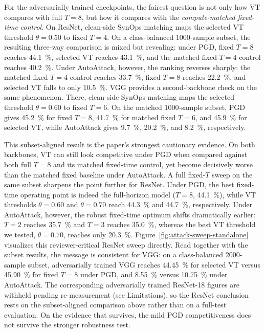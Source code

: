 \documentclass[11pt]{article}
\begin{document}
For the adversarially trained checkpoints, the fairest question is not only how VT compares with full $T=8$, but how it compares with the \emph{compute-matched fixed-time control}. On ResNet, clean-side SynOps matching maps the selected VT threshold $\theta=0.50$ to fixed $T=4$. On a class-balanced \num{1000}-sample subset, the resulting three-way comparison is mixed but revealing: under PGD, fixed $T=8$ reaches \SI{44.1}{\percent}, selected VT reaches \SI{43.1}{\percent}, and the matched fixed-$T=4$ control reaches \SI{40.2}{\percent}. Under AutoAttack, however, the ranking reverses sharply: the matched fixed-$T=4$ control reaches \SI{33.7}{\percent}, fixed $T=8$ reaches \SI{22.2}{\percent}, and selected VT falls to only \SI{10.5}{\percent}. VGG provides a second-backbone check on the same phenomenon. There, clean-side SynOps matching maps the selected threshold $\theta=0.60$ to fixed $T=6$. On the matched \num{1000}-sample subset, PGD gives \SI{45.2}{\percent} for fixed $T=8$, \SI{41.7}{\percent} for matched fixed $T=6$, and \SI{45.9}{\percent} for selected VT, while AutoAttack gives \SI{9.7}{\percent}, \SI{20.2}{\percent}, and \SI{8.2}{\percent}, respectively.

This subset-aligned result is the paper's strongest cautionary evidence. On both backbones, VT can still look competitive under PGD when compared against both full $T=8$ and its matched fixed-time control, yet become decisively worse than the matched fixed baseline under AutoAttack. A full fixed-$T$ sweep on the same subset sharpens the point further for ResNet. Under PGD, the best fixed-time operating point is indeed the full-horizon model ($T=8$, \SI{44.1}{\percent}), while VT thresholds $\theta=0.60$ and $\theta=0.70$ reach \SI{44.3}{\percent} and \SI{44.7}{\percent}, respectively. Under AutoAttack, however, the robust fixed-time optimum shifts dramatically earlier: $T=2$ reaches \SI{35.7}{\percent} and $T=3$ reaches \SI{35.0}{\percent}, whereas the best VT threshold we tested, $\theta=0.70$, reaches only \SI{20.3}{\percent}. Figure~\ref{fig:attack-sweep-standalone} visualizes this reviewer-critical ResNet sweep directly. Read together with the subset results, the message is consistent for VGG: on a class-balanced \num{2000}-sample subset, adversarially trained VGG reaches \SI{44.45}{\percent} for selected VT versus \SI{45.90}{\percent} for fixed $T=8$ under PGD, and \SI{8.55}{\percent} versus \SI{10.75}{\percent} under AutoAttack. The corresponding adversarially trained ResNet-18 figures are withheld pending re-measurement (see Limitations), so the ResNet conclusion rests on the subset-aligned comparison above rather than on a full-test evaluation. On the evidence that survives, the mild PGD competitiveness does not survive the stronger robustness test.
\end{document}
